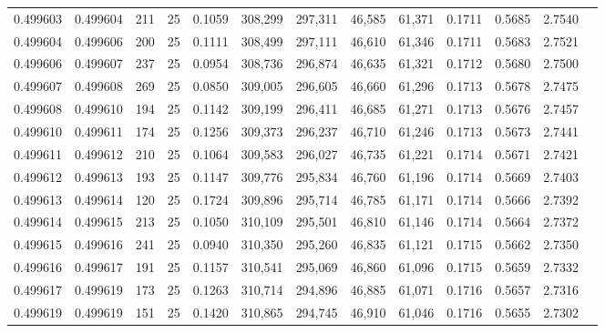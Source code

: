 \begin{tabular}{rrrrrrrrrrrrr}
0.499603 & 0.499604 & 211 &  25 &                                     0.1059 & 308,299 & 297,311 &  46,585 &  61,371 & 0.1711 & 0.5685 & 2.7540 \\
0.499604 & 0.499606 & 200 &  25 &                                     0.1111 & 308,499 & 297,111 &  46,610 &  61,346 & 0.1711 & 0.5683 & 2.7521 \\
0.499606 & 0.499607 & 237 &  25 &                                     0.0954 & 308,736 & 296,874 &  46,635 &  61,321 & 0.1712 & 0.5680 & 2.7500 \\
0.499607 & 0.499608 & 269 &  25 &                                     0.0850 & 309,005 & 296,605 &  46,660 &  61,296 & 0.1713 & 0.5678 & 2.7475 \\
0.499608 & 0.499610 & 194 &  25 &                                     0.1142 & 309,199 & 296,411 &  46,685 &  61,271 & 0.1713 & 0.5676 & 2.7457 \\
0.499610 & 0.499611 & 174 &  25 &                                     0.1256 & 309,373 & 296,237 &  46,710 &  61,246 & 0.1713 & 0.5673 & 2.7441 \\
0.499611 & 0.499612 & 210 &  25 &                                     0.1064 & 309,583 & 296,027 &  46,735 &  61,221 & 0.1714 & 0.5671 & 2.7421 \\
0.499612 & 0.499613 & 193 &  25 &                                     0.1147 & 309,776 & 295,834 &  46,760 &  61,196 & 0.1714 & 0.5669 & 2.7403 \\
0.499613 & 0.499614 & 120 &  25 &                                     0.1724 & 309,896 & 295,714 &  46,785 &  61,171 & 0.1714 & 0.5666 & 2.7392 \\
0.499614 & 0.499615 & 213 &  25 &                                     0.1050 & 310,109 & 295,501 &  46,810 &  61,146 & 0.1714 & 0.5664 & 2.7372 \\
0.499615 & 0.499616 & 241 &  25 &                                     0.0940 & 310,350 & 295,260 &  46,835 &  61,121 & 0.1715 & 0.5662 & 2.7350 \\
0.499616 & 0.499617 & 191 &  25 &                                     0.1157 & 310,541 & 295,069 &  46,860 &  61,096 & 0.1715 & 0.5659 & 2.7332 \\
0.499617 & 0.499619 & 173 &  25 &                                     0.1263 & 310,714 & 294,896 &  46,885 &  61,071 & 0.1716 & 0.5657 & 2.7316 \\
0.499619 & 0.499619 & 151 &  25 &                                     0.1420 & 310,865 & 294,745 &  46,910 &  61,046 & 0.1716 & 0.5655 & 2.7302 \\

\end{tabular}
